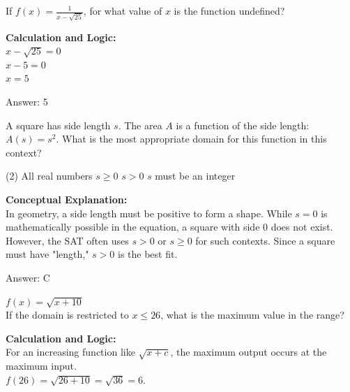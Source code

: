\documentclass[11pt,paper=a4,answers]{exam}
\begin{document}
\begin{questions}
\vspace{40pt}

\question
If $f(x) = \frac{1}{x - \sqrt{25}}$, for what value of $x$ is the function undefined?

\begin{solution}
\textbf{Calculation and Logic:} \\
$x - \sqrt{25} = 0$ \\
$x - 5 = 0$ \\
$x = 5$

\vspace{30pt}

Answer: \colorbox{yellow!100}{5}
\end{solution}

\vspace{40pt}

\question
A square has side length $s$. The area $A$ is a function of the side length: $A(s) = s^2$. What is the most appropriate domain for this function in this context?
\begin{tasks}(2)
    \task All real numbers
    \task $s \geq 0$
    \task $s > 0$
    \task $s$ must be an integer
\end{tasks}

\begin{solution}
\textbf{Conceptual Explanation:} \\
In geometry, a side length must be positive to form a shape. While $s=0$ is mathematically possible in the equation, a square with side 0 does not exist. However, the SAT often uses $s > 0$ or $s \geq 0$ for such contexts. Since a square must have "length," $s > 0$ is the best fit.

\vspace{30pt}

Answer: \colorbox{yellow!100}{C}
\end{solution}

\vspace{40pt}

\question
$f(x) = \sqrt{x+10}$ \\
If the domain is restricted to $x \leq 26$, what is the maximum value in the range?

\begin{solution}
\textbf{Calculation and Logic:} \\
For an increasing function like $\sqrt{x+c}$, the maximum output occurs at the maximum input. \\
$f(26) = \sqrt{26 + 10} = \sqrt{36} = 6$.


\end{solution}
\end{questions}
\end{document}
